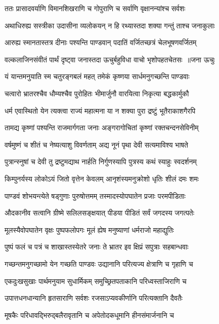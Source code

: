 \twolineshloka
{ततः प्रासादवर्याणि विमानशिखराणि च}
{गोपुराणि च सर्वाणि वृक्षानन्यांश्च सर्वशः}


\twolineshloka
{अथाधिरुह्य सस्त्रीका उदासीना व्यलोकयन्}
{न हि रथ्यास्तदा शक्या गन्तुं ताश्च जनाकुलाः}


\twolineshloka
{आरुह्य स्मानतास्तत्र दीनाः पश्यन्ति पाण्डवान्}
{पदातिं वर्जितच्छत्रं चेलभूषणवर्जितम्}


\threelineshloka
{वल्कलाजिनसंवीतं पार्थं दृष्ट्वा जनास्तदा}
{ऊचुर्बहुविधा वाचो भृशोपहतचेतसः ॥जना ऊचुः}
{}


\twolineshloka
{यं यान्तमनुयाति स्म चतुरङ्गबलं महत्}
{तमेकं कृष्णया सार्धमनुगच्छन्ति पाण्डवाः}


\twolineshloka
{चत्वारो भ्रातरश्चैव धौम्यश्चैव पुरोहितः}
{भीमार्जुनौ वारयित्वा निकृत्या बद्धकार्मुकौ}


\twolineshloka
{धर्म एवास्थितो येन त्यक्त्वा राज्यं महात्मना}
{या न शक्या पुरा द्रष्टुं भूतैराकाशगैरपि}


\twolineshloka
{तामद्य कृष्णां पश्यन्ति राजमार्गगता जनाः}
{अङ्गरागोचितां कृष्णां रक्तचन्दनसेविनीम्}


\twolineshloka
{वर्षमुष्णं च शीतं च नेष्यत्याशु विवर्णताम्}
{अद्य नूनं पृथा देवी सत्यमाविश्य भाषते}


\twolineshloka
{पुत्रान्स्नुषां च देवी तु द्रष्टुमद्याथ नार्हति}
{निर्गुणस्यापि पुत्रस्य कथं स्याहुः स्वदर्शनम्}


\twolineshloka
{किम्पुनर्यस्य लोकोऽयं जितो वृत्तेन केवलम्}
{आनृशंस्यमनुक्रोशो धृतिः शीलं दमः शमः}


\twolineshloka
{पाण्डवं शोभयन्त्येते षड्गुणाः पुरुषोत्तमम्}
{तस्मादस्योपघातेन प्रजाः परमपीडिताः}


\twolineshloka
{औदकानीव सत्वानि ग्रीष्मे सलिलसङ्क्षयात्}
{पीडया पीडितं सर्वं जगदस्य जगत्पतेः}


\twolineshloka
{मूलस्यैवोपघातेन वृक्षः पुष्पफलोपगः}
{मूलं ह्येष मनुष्याणां धर्मराजो महाद्युतिः}


\twolineshloka
{पुष्पं फलं च पत्रं च शाखास्तस्येतरे जनाः}
{ते भ्रातर इव क्षिप्रं सपुत्राः सहबान्धवाः}


\twolineshloka
{गच्छन्तमनुगच्छामो येन गच्छति पाण्डवः}
{उद्यानानि परित्यज्य क्षेत्राणि च गृहाणि च}


\twolineshloka
{एकदुःखसुखाः पार्थमनुयाम सुधार्मिकम्}
{समुच्छ्रितपताकानि परिध्वस्ताजिराणि च}


\twolineshloka
{उपात्तधनधान्यानि हृतसाराणि सर्वशः}
{रजसाऽप्यवकीर्णानि परित्यक्तानि दैवतैः}


\twolineshloka
{मूषकैः परिधावद्भिरुद्बलैरावृतानि च}
{अपेतोदकधूमानि हीनसंमार्जनानि च}


